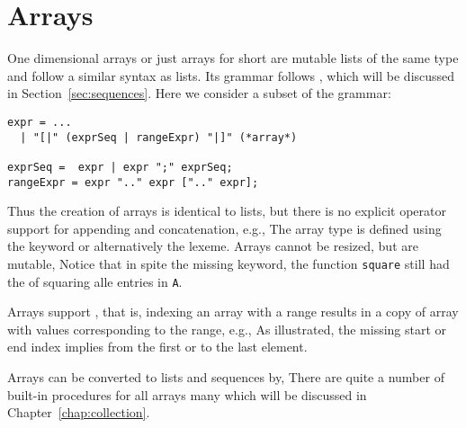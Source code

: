 \section{Arrays}
\label{sec:arrays}
One dimensional arrays or just arrays for short are mutable lists of the same type and follow a similar syntax as lists. Its grammar follows , which will be discussed in Section~\ref{sec:sequences}. Here we consider a subset of the grammar:
%
\begin{lstlisting}[language=ebnf]
expr = ... 
  | "[|" (exprSeq | rangeExpr) "|]" (*array*)

exprSeq =  expr | expr ";" exprSeq;
rangeExpr = expr ".." expr [".." expr];
\end{lstlisting}
%
Thus the creation of arrays is identical to lists, but there is no explicit operator support for appending and concatenation, e.g.,
%
%
The array type is defined using the  keyword or alternatively the \keyword{[]} lexeme. Arrays cannot be resized, but are mutable,
%
%
Notice that in spite the missing  keyword, the function \lstinline{square} still had the  of squaring alle entries in \lstinline{A}.  

Arrays support , that is, indexing an array with a range results in a copy of array with values corresponding to the range, e.g.,
%
%
As illustrated, the missing start or end index implies from the first or to the last element.

Arrays can be converted to lists and sequences by,
%
%
There are quite a number of built-in procedures for all arrays many which will be discussed in Chapter~\ref{chap:collection}.

